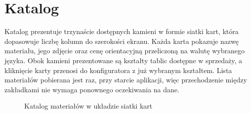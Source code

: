 \section{Katalog}
\label{sec:prez-katalog}

Katalog prezentuje trzynaście dostępnych kamieni w formie siatki kart, która dopasowuje liczbę kolumn do szerokości ekranu. Każda karta pokazuje nazwę materiału, jego zdjęcie oraz cenę orientacyjną przeliczoną na walutę wybranego języka. Obok kamieni prezentowane są kształty tablic dostępne w sprzedaży, a kliknięcie karty przenosi do konfiguratora z już wybranym kształtem. Lista materiałów pobierana jest raz, przy starcie aplikacji, więc przechodzenie między zakładkami nie wymaga ponownego oczekiwania na dane.

\begin{figure}[htbp]
\centering
\caption{Katalog materiałów w układzie siatki kart}
\label{fig:prez-katalog}
\end{figure}
